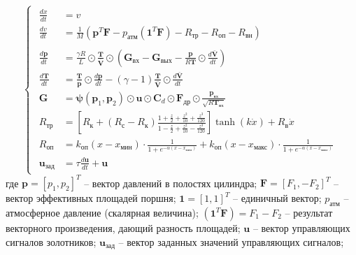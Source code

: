 \begin{equation}
    \begin{cases}
        \begin{alignedat}{2}
            \frac{dx}{dt}          & = v                                                                                                                                                                                                    \\
            \frac{dv}{dt}          & = \frac{1}{M}(\mathbf{p}^T\mathbf{F} - p_\text{атм}(\mathbf{1}^T\mathbf{F}) - R_\text{тр} - R_\text{оп} - R_\text{вн} )                                                                                \\                                                                                                                   \\
            \frac{d\mathbf{p}}{dt} & = \frac{\gamma R}{L} \odot \frac{\mathbf{T}}{\bar{\mathbf{V}}} \odot \left(\mathbf{G}_{\text{вх}} - \mathbf{G}_{\text{вых}} - \frac{\mathbf{p}}{R\mathbf{T}} \odot \frac{d\bar{\mathbf{V}}}{dt}\right) \\
            \frac{d\mathbf{T}}{dt} & = \frac{\mathbf{T}}{\mathbf{p}} \odot \frac{d\mathbf{p}}{dt} - (\gamma - 1) \frac{\mathbf{T}}{\bar{\mathbf{V}}} \odot \frac{d\bar{\mathbf{V}}}{dt}                                                     \\
            \mathbf{G}             & = \boldsymbol{\psi}(\mathbf{p}_1, \mathbf{p}_2) \odot \mathbf{u} \odot \mathbf{C}_d \odot \mathbf{F}_\text{др} \odot \frac{\mathbf{p}_{\text{вх}}}{\sqrt{R\mathbf{T}_\text{вх}}}                       \\
            R_\text{тр}            & = \left[R_\text{к} + (R_\text{с} - R_\text{к})\frac{1 + \frac{z}{2} + \frac{z^2}{10} + \frac{z^3}{120}}{1 - \frac{z}{2} + \frac{z^2}{10} - \frac{z^3}{120}}\right]\tanh(k\dot{x}) + R_\text{в}\dot{x}  \\
            R_\text{оп}            & = k_\text{оп}(x - x_\text{мин})\cdot \frac{1}{1 + e^{-\alpha(x - x_\text{мин})}} + k_\text{оп}(x - x_\text{макс})\cdot \frac{1}{1 + e^{-\alpha(x - x_\text{макс})}}                                    \\
            \mathbf{u}_\text{зад}  & = \tau \frac{d\mathbf{u}}{dt} + \mathbf{u}
        \end{alignedat}
    \end{cases}
\end{equation}
где
$\mathbf{p} = [p_1, p_2]^T$ -- вектор давлений в полостях цилиндра;
$\mathbf{F} = [F_1, -F_2]^T$ -- вектор эффективных площадей поршня;
$\mathbf{1} = [1, 1]^T$ -- единичный вектор;
$p_\text{атм}$ -- атмосферное давление (скалярная величина);
$(\mathbf{1}^T\mathbf{F}) = F_1 - F_2$ -- результат векторного произведения, дающий разность площадей;
$\mathbf{u}$ -- вектор управляющих сигналов золотников;
$\mathbf{u}_\text{зад}$ -- вектор заданных значений управляющих сигналов;

